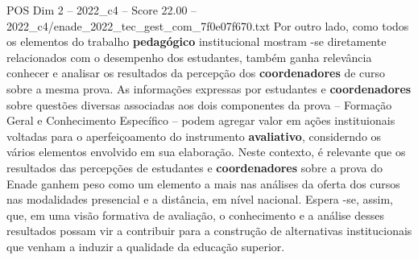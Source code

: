 \begin{textsample}{POS Dim 2 – 2022\_c4 – Score 22.00 – 2022\_c4/enade\_2022\_tec\_gest\_com\_7f0e07f670.txt}
Por outro lado, como todos os elementos do trabalho \textbf{pedagógico} institucional mostram -se diretamente relacionados com o desempenho dos estudantes, também ganha relevância conhecer e analisar os resultados da percepção dos \textbf{coordenadores} de curso sobre a mesma prova.
As informações expressas por estudantes e \textbf{coordenadores} sobre questões diversas associadas aos dois componentes da prova – Formação Geral e Conhecimento Específico – podem agregar valor em ações instituionais voltadas para o aperfeiçoamento do instrumento \textbf{avaliativo}, considerndo os vários elementos envolvido em sua elaboração.
Neste contexto, é relevante que os resultados das percepções de estudantes e \textbf{coordenadores} sobre a prova do Enade ganhem peso como um elemento a mais nas análises da oferta dos cursos nas modalidades presencial e a distância, em nível nacional.
Espera -se, assim, que, em uma visão formativa de avaliação, o conhecimento e a análise desses resultados possam vir a contribuir para a construção de alternativas institucionais que venham a induzir a qualidade da educação superior.

\end{textsample}
